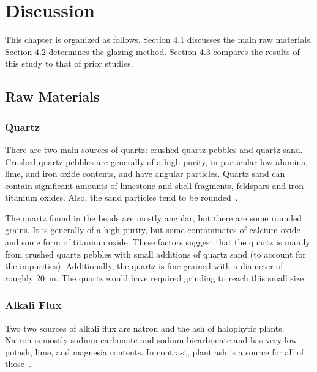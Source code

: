 \chapter{Discussion}

This chapter is organized as follows. Section 4.1 discusses the main raw materials. Section 4.2 determines the glazing method. Section 4.3 compares the results of this study to that of prior studies.



\section{Raw Materials}

\subsection{Quartz}

There are two main sources of quartz: crushed quartz pebbles and quartz sand. Crushed quartz pebbles are generally of a high purity, in particular low alumina, lime, and iron oxide contents, and have angular particles. Quartz sand can contain significant amounts of limestone and shell fragments, feldspars and iron-titanium oxides. Also, the sand particles tend to be rounded~\cite{tite07}.

The quartz found in the beads are mostly angular, but there are some rounded grains. It is generally of a high purity, but some contaminates of calcium oxide and some form of titanium oxide. These factors suggest that the quartz is mainly from crushed quartz pebbles with small additions of quartz sand (to account for the impurities). Additionally, the quartz is fine-grained with a diameter of roughly 20~\textmu m. The quartz would have required grinding to reach this small size.

\subsection{Alkali Flux}

Two two sources of alkali flux are natron and the ash of halophytic plants. Natron is mostly sodium carbonate and sodium bicarbonate and has very low potash, lime, and magnesia contents. In contrast, plant ash is a source for all of those~\cite{tite07}.

